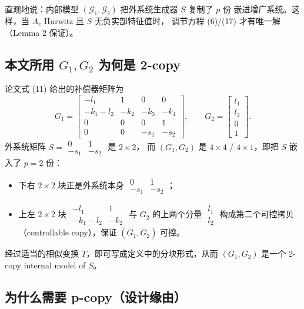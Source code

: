 直观地说：内部模型 $(\mathcal G_1, \mathcal G_2)$ 把外系统生成器 $S$ 复制了 $p$ 份
嵌进增广系统。这样，当 $A_c$ Hurwitz 且 $S$ 无负实部特征值时，
调节方程 (6)/(17) 才有唯一解（Lemma 2 保证）。

\subsection{本文所用 $G_1, G_2$ 为何是 2-copy}

论文式 (11) 给出的补偿器矩阵为
\[
G_1 = \begin{bmatrix}
-l_1 & 1 & 0 & 0\\
-k_1-l_2 & -k_2 & -k_3 & -k_4\\
0 & 0 & 0 & 1\\
0 & 0 & -s_1 & -s_2
\end{bmatrix},\qquad
G_2 = \begin{bmatrix} l_1 \\ l_2 \\ 0 \\ 1\end{bmatrix}.
\]
外系统矩阵 $S=\begin{smallmatrix}0&1\\-s_1&-s_2\end{smallmatrix}$ 是 $2\times 2$，
而 $(G_1,G_2)$ 是 $4\times 4$ / $4\times 1$，即把 $S$ 嵌入了 $p=2$ 份：
\begin{itemize}
  \item 下右 $2\times 2$ 块正是外系统本身 $\begin{smallmatrix}0&1\\-s_1&-s_2\end{smallmatrix}$；
  \item 上左 $2\times 2$ 块 $\begin{smallmatrix}-l_1&1\\-k_1-l_2&-k_2\end{smallmatrix}$
    与 $G_2$ 的上两个分量 $\begin{smallmatrix}l_1\\l_2\end{smallmatrix}$
    构成第二个可控拷贝（controllable copy），保证 $(\bar G_1,\bar G_2)$ 可控。
\end{itemize}
经过适当的相似变换 $T$，即可写成定义中的分块形式，从而
$(G_1,G_2)$ 是一个 2-copy internal model of $S$。

\subsection{为什么需要 p-copy（设计缘由）}

